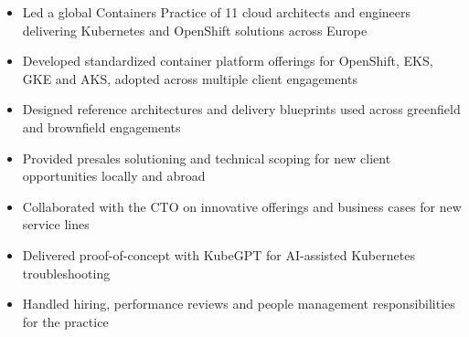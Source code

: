 \begin{itemize}[leftmargin=*, nosep, after=\vspace{0.05cm}]
    \item Led a global Containers Practice of 11 cloud architects and engineers delivering Kubernetes and OpenShift solutions across Europe
    \item Developed standardized container platform offerings for OpenShift, EKS, GKE and AKS, adopted across multiple client engagements
    \item Designed reference architectures and delivery blueprints used across greenfield and brownfield engagements
    \item Provided presales solutioning and technical scoping for new client opportunities locally and abroad
    \item Collaborated with the CTO on innovative offerings and business cases for new service lines
    \item Delivered proof-of-concept with KubeGPT for AI-assisted Kubernetes troubleshooting
    \item Handled hiring, performance reviews and people management responsibilities for the practice
\end{itemize}

